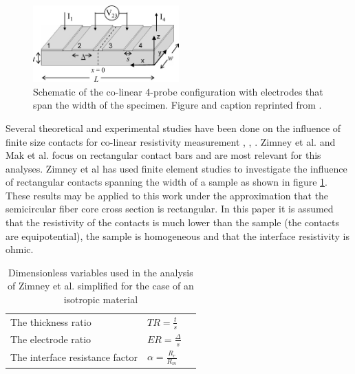   
\begin{figure}[h]
  \centering
    \includegraphics[width=0.5\textwidth]{fig/4pp/finite_size_contacts.png}
 \caption{Schematic of the co-linear 4-probe configuration with electrodes that span the width of the specimen. Figure and caption reprinted from \cite{Zimney2007CorrectionStudy}.}
\label{fig1}
\end{figure}

 Several theoretical and experimental studies have been done on the influence of finite size contacts for co-linear resistivity measurement \cite{Zimney2007CorrectionStudy}, \cite{Mak1989SpecificArsenide}, \cite{Ilse2014GeometricalMeasurements} \cite{Esposito2000DeterminationCrystals}. Zimney et al. and Mak et al. focus on rectangular contact bars and are most relevant for this analyses. Zimney et al has used finite element studies to investigate the influence of rectangular contacts spanning the width of a sample as shown in figure \ref{fig1}. These results may be applied to this work under the approximation that the semicircular fiber core cross section is rectangular. In this paper it is assumed that the resistivity of the contacts is much lower than the sample (the contacts are equipotential), the sample is homogeneous and that the interface resistivity is ohmic.%
 
 \begin{table}[b]
\begin{center}
    \begin{tabular}{|l|l|l|  }
    \hline
     The thickness ratio & $TR = \frac{t}{s}$ \\ 
     The electrode ratio & $ER =  \frac{\Delta}{s}$ \\ 
     The interface resistance factor & $\alpha = \frac{R_c}{R_m}$ \\
     \hline
    \end{tabular}
\end{center}
\caption{Dimensionless variables used in the analysis of Zimney et al. simplified for the case of an isotropic material \cite{Zimney2007CorrectionStudy}}
\label{Tab1}
\end{table}
 
